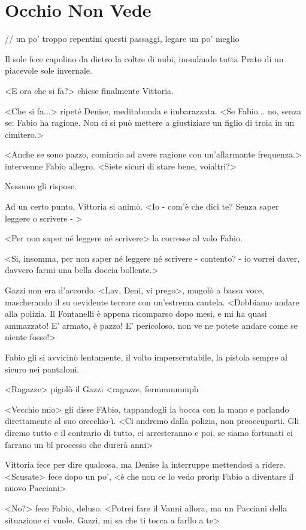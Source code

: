 \chapter{Occhio Non Vede}

// un po' troppo repentini questi passaggi, legare un po' meglio

Il sole fece capolino da dietro la coltre di nubi, inondando tutta Prato di un piacevole sole invernale.

<E ora che si fa?> chiese finalmente Vittoria.

<Che si fa...> ripeté Denise, meditabonda e imbarazzata. <Se Fabio... no, senza se: Fabio ha ragione. Non ci si può mettere a giustiziare un figlio di troia in un cimitero.>

<Anche se sono pazzo, comincio ad avere ragione con un'allarmante frequenza.> intervenne Fabio allegro. <Siete sicuri di stare bene, voialtri?>

Nessuno gli rispose.

Ad un certo punto, Vittoria si animò. <Io - com'è che dici te? Senza saper leggere o scrivere - >

<Per non saper né leggere né scrivere> la corresse al volo Fabio.

<Si, insomma, per non saper né leggere né scrivere - contento? - io vorrei daver, davvero farmi una bella doccia bollente.>

Gazzi non era d'accordo. <Lav, Deni, vi prego>, mugolò a bassa voce, mascherando il su oevidente terrore con un'estrema cautela. <Dobbiamo andare alla polizia. Il Fontanelli è appena ricomparso dopo mesi, e mi ha quasi ammazzato! E' armato, è pazzo! E' pericoloso, non ve ne potete andare come se niente fosse!>

Fabio gli si avvicinò lentamente, il volto imperscrutabile, la pistola sempre al sicuro nei pantaloni. 

<Ragazze> pigolò il Gazzi <ragazze, fermmmmmph

<Vecchio mio> gli disse FAbio, tappandogli la bocca con la mano e parlando direttamente al suo orecchio-ì. <Ci andremo dalla polizia, non preoccuparti. Gli diremo tutto e il contrario di tutto, ci arresteranno e poi, se siamo fortunati ci farrano un bl processo che durerà anni>

Vittoria fece per dire qualcosa, ma Denise la interruppe mettendosi a ridere. <Scusate> fece dopo un po', <è che non ce lo vedo prorip Fabio a diventare il nuovo Pacciani>

<No?> fece Fabio, deluso. <Potrei fare il Vanni allora, ma un  Pacciani della situazione ci vuole. Gazzi, mi sa che ti tocca a farllo a te>

